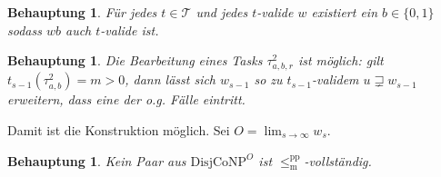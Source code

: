 \documentclass[nofonts]{uebung}
\newtheorem{claim}[theorem]{Behauptung}
\def\DisjCoNP{\ensuremath{\mathrm{DisjCoNP}}}
\def\leqmpp{\ensuremath{\leq_\mathrm{m}^\mathrm{pp}}}
\begin{document}
\begin{claim}
    Für jedes $t\in\mathcal T$ und jedes $t$-valide $w$ existiert ein $b\in\{0,1\}$ sodass $wb$ auch $t$-valide ist.
\end{claim}

\begin{claim}
    Die Bearbeitung eines Tasks $\tau^2_{a,b,r}$ ist möglich: gilt $t_{s-1}(\tau^2_{a,b})=m>0$, dann lässt sich $w_{s-1}$ so zu $t_{s-1}$-validem $u\sqsupsetneq w_{s-1}$ erweitern, dass eine der o.g. Fälle eintritt.
\end{claim}

Damit ist die Konstruktion möglich. Sei $O=\lim_{s\to\infty} w_s$.

\begin{claim}
    Kein Paar aus $\DisjCoNP^O$ ist $\leqmpp$-vollständig.
\end{claim}
\end{document}
